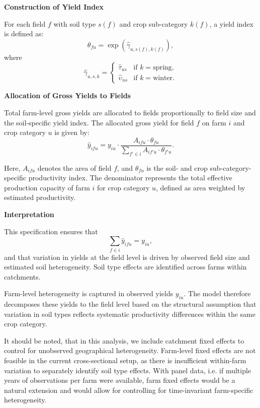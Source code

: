 \documentclass{article}
\begin{document}
\vspace{0.5cm}

\textbf{Construction of Yield Index}

For each field $f$ with soil type $s(f)$ and crop sub-category $k(f)$, a yield index is defined as:
\[
\theta_{fu}
=
\exp\!\left(
\hat{\gamma}_{u,s(f),k(f)}
\right),
\]
where
\[
\hat{\gamma}_{u,s,k}
=
\begin{cases}
\hat{\tau}_{us} & \text{if } k = \text{spring}, \\
\hat{\upsilon}_{us} & \text{if } k = \text{winter}.
\end{cases}
\]

\vspace{0.5cm}

\textbf{Allocation of Gross Yields to Fields}

Total farm-level gross yields are allocated to fields proportionally to field size and the soil-specific yield index. The allocated gross yield for field $f$ on farm $i$ and crop category $u$ is given by:
\[
\hat{y}_{ifu}
=
y_{iu}
\cdot
\frac{
A_{ifu} \cdot \theta_{fu}
}{
\sum_{f' \in i}
A_{if'u} \cdot \theta_{f'u}
}.
\]

Here, $A_{ifu}$ denotes the area of field $f$, and $\theta_{fu}$ is the soil- and crop sub-category-specific productivity index. The denominator represents the total effective production capacity of farm $i$ for crop category $u$, defined as area weighted by estimated productivity.

\vspace{0.5cm}

\textbf{Interpretation}

This specification ensures that
\[
\sum_{f \in i} \hat{y}_{ifu} = y_{iu},
\]
and that variation in yields at the field level is driven by observed field size and estimated soil heterogeneity. Soil type effects are identified across farms within catchments.

Farm-level heterogeneity is captured in observed yields $y_{iu}$. The model therefore decomposes these yields to the field level based on the structural assumption that variation in soil types reflects systematic productivity differences within the same crop category.

\vspace{0.3cm}
\noindent
It should be noted, that in this analysis, we include catchment fixed effects to control for unobserved geographical heterogeneity. Farm-level fixed effects are not feasible in the current cross-sectional setup, as there is insufficient within-farm variation to separately identify soil type effects. With panel data, i.e. if multiple years of observations per farm were available, farm fixed effects would be a natural extension and would allow for controlling for time-invariant farm-specific heterogeneity.
\end{document}
